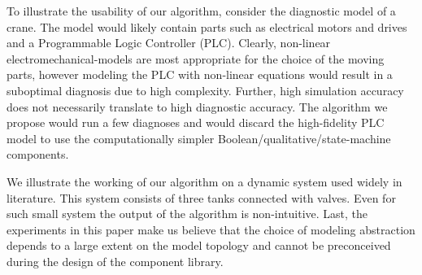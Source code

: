 \par
To illustrate the usability of our algorithm, consider the diagnostic
model of a crane. The model would likely contain parts such as
electrical motors and drives and a Programmable Logic Controller
(PLC). Clearly, non-linear electromechanical-models are most
appropriate for the choice of the moving parts, however modeling the
PLC with non-linear equations would result in a suboptimal diagnosis
due to high complexity. Further, high simulation accuracy does not
necessarily translate to high diagnostic accuracy. The algorithm we
propose would run a few diagnoses and would discard the high-fidelity
PLC model to use the computationally simpler
Boolean/qualitative/state-machine components.
\par
We illustrate the working of our algorithm on a dynamic system used
widely in literature. This system consists of three tanks connected
with valves. Even for such small system the output of the algorithm is
non-intuitive. Last, the experiments in this paper make us believe
that the choice of modeling abstraction depends to a large extent on
the model topology and cannot be preconceived during the design of the
component library.
